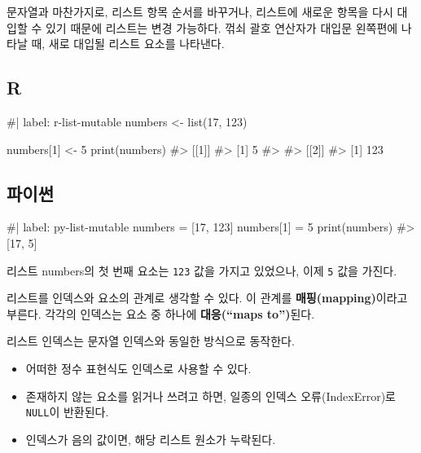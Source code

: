 \documentclass[
  letterpaper,
]{book}
\newenvironment{Shaded}{\begin{snugshade}}{\end{snugshade}}
\newcommand{\NormalTok}[1]{\textcolor[rgb]{0.00,0.23,0.31}{#1}}
\providecommand{\tightlist}{%
  \setlength{\itemsep}{0pt}\setlength{\parskip}{0pt}}\usepackage{longtable,booktabs,array}
\begin{document}
문자열과 마찬가지로, 리스트 항목 순서를 바꾸거나, 리스트에 새로운 항목을
다시 대입할 수 있기 때문에 리스트는 변경 가능하다. 꺾쇠 괄호 연산자가
대입문 왼쪽편에 나타날 때, 새로 대입될 리스트 요소를 나타낸다.

\subsection{R}

\begin{Shaded}
\begin{Highlighting}[]
\NormalTok{\#| label: r{-}list{-}mutable}
\NormalTok{numbers \textless{}{-} list(17, 123)}

\NormalTok{numbers[1] \textless{}{-} 5}
\NormalTok{print(numbers)}
\NormalTok{\#\textgreater{} [[1]]}
\NormalTok{\#\textgreater{} [1] 5}
\NormalTok{\#\textgreater{} }
\NormalTok{\#\textgreater{} [[2]]}
\NormalTok{\#\textgreater{} [1] 123}
\end{Highlighting}
\end{Shaded}

\subsection{파이썬}

\begin{Shaded}
\begin{Highlighting}[]
\NormalTok{\#| label: py{-}list{-}mutable}
\NormalTok{numbers = [17, 123]}
\NormalTok{numbers[1] = 5}
\NormalTok{print(numbers)}
\NormalTok{\#\textgreater{} [17, 5]}
\end{Highlighting}
\end{Shaded}

리스트 numbers의 첫 번째 요소는 \texttt{123} 값을 가지고 있었으나, 이제
\texttt{5} 값을 가진다. 

리스트를 인덱스와 요소의 관계로 생각할 수 있다. 이 관계를
\textbf{매핑(mapping)}이라고 부른다. 각각의 인덱스는 요소 중 하나에
\textbf{대응(``maps to'')}된다.  

리스트 인덱스는 문자열 인덱스와 동일한 방식으로 동작한다.

\begin{itemize}
\tightlist
\item
  어떠한 정수 표현식도 인덱스로 사용할 수 있다.
\item
  존재하지 않는 요소를 읽거나 쓰려고 하면, 일종의 인덱스
  오류(IndexError)로 \texttt{NULL}이 반환된다.
\item
  인덱스가 음의 값이면, 해당 리스트 원소가 누락된다.
   
\end{itemize}
\end{document}
